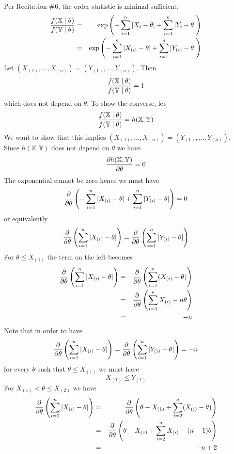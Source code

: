 \documentclass[12pt]{article}
\begin{document}
\bigskip
\noindent
Per Recitation \#6, the order statistic is minimal sufficient.
\begin{eqnarray*}
{f(\mathbb X\mid\theta)\over f(\mathbb Y\mid\theta)}
&=&\exp\left(-\sum_{i=1}^n|X_i-\theta|+\sum_{i=1}^n|Y_i-\theta|\right)\\
&=&\exp\left(-\sum_{i=1}^n|X_{(i)}-\theta|+\sum_{i=1}^n|Y_{(i)}-\theta|\right)
\end{eqnarray*}
Let $(X_{(1)},\ldots,X_{(n)})=(Y_{(1)},\ldots,Y_{(n)})$. Then
$${f(\mathbb X\mid\theta)\over f(\mathbb Y\mid\theta)}=1$$
which does not depend on $\theta$.
To show the converse, let
$${f(\mathbb X\mid\theta)\over f(\mathbb Y\mid\theta)}
=h(\mathbb X,\mathbb Y)$$
We want to show that this implies
$(X_{(1)},\ldots,X_{(n)})=(Y_{(1)},\ldots,Y_{(n)})$.
Since $h(\mathbb X,\mathbb Y)$ does not depend on $\theta$ we have
$${\partial h(\mathbb X,\mathbb Y)\over\partial\theta}=0$$
The exponential cannot be zero hence we must have
$${\partial\over\partial\theta}
\left(-\sum_{i=1}^n|X_{(i)}-\theta|+\sum_{i=1}^n|Y_{(i)}-\theta|\right)=0$$
or equivalently
$$
{\partial\over\partial\theta}
\left(\sum_{i=1}^n|X_{(i)}-\theta|\right)
=
{\partial\over\partial\theta}
\left(\sum_{i=1}^n|Y_{(i)}-\theta|\right)
$$
For $\theta\le X_{(1)}$ the term on the left becomes
\begin{eqnarray*}
{\partial\over\partial\theta}
\left(\sum_{i=1}^n|X_{(i)}-\theta|\right)
&=&
{\partial\over\partial\theta}
\left(\sum_{i=1}^n(X_{(i)}-\theta)\right)\\
&=&
{\partial\over\partial\theta}
\left(\sum_{i=1}^nX_{(i)}-n\theta\right)\\
&=&-n
\end{eqnarray*}
%
%
%
Note that in order to have
$$
{\partial\over\partial\theta}
\left(\sum_{i=1}^n|X_{(i)}-\theta|\right)
=
{\partial\over\partial\theta}
\left(\sum_{i=1}^n|Y_{(i)}-\theta|\right)=-n
$$
for every $\theta$ such that $\theta\le X_{(1)}$ we must have
$$X_{(1)}\le Y_{(1)}$$
%
%
%
For $X_{(1)}<\theta\le X_{(2)}$ we have
\begin{eqnarray*}
{\partial\over\partial\theta}
\left(\sum_{i=1}^n|X_{(i)}-\theta|\right)
&=&
{\partial\over\partial\theta}
\left(\theta-X_{(1)}+\sum_{i=2}^n(X_{(i)}-\theta)\right)\\
&=&
{\partial\over\partial\theta}
\left(\theta-X_{(1)}+\sum_{i=2}^nX_{(i)}-(n-1)\theta\right)\\
&=&-n+2
\end{eqnarray*}
\end{document}
